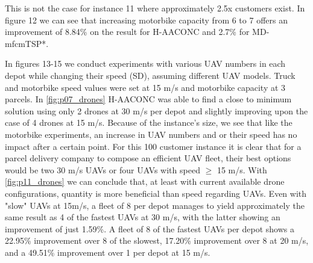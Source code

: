 \documentclass{article}
\begin{document}
	\par 
	This is not the case for instance 11 where approximately 2.5x customers exist. In figure 12 we can see that increasing motorbike capacity from 6 to 7 offers an improvement of 8.84\% on the result for H-AACONC and 2.7\% for MD-mfcmTSP*.
	\par 
	In figures 13-15 we conduct experiments with various UAV numbers in each depot while changing their speed (SD), assuming different UAV models. Truck and motorbike speed values were set at 15 m/s and motorbike capacity at 3 parcels. In \autoref{fig:p07_drones} H-AACONC was able to find a close to minimum solution using only 2 drones at 30 m/s per depot and slightly improving upon the case of 4 drones at 15 m/s. Because of the instance's size, we see that like the motorbike experiments, an increase in UAV numbers and or their speed has no impact after a certain point. For this 100 customer instance it is clear that for a parcel delivery company to compose an efficient UAV fleet, their best options would be two 30 m/s UAVs or four UAVs with speed $\geq$ 15 m/s. With \autoref{fig:p11_drones} we can conclude that, at least with current available drone configurations, quantity is more beneficial than speed regarding UAVs. Even with "slow" UAVs at 15m/s, a fleet of 8 per depot manages to yield approximately the same result as 4 of the fastest UAVs at 30 m/s, with the latter showing an improvement of just 1.59\%. A fleet of 8 of the fastest UAVs per depot shows a 22.95\% improvement over 8 of the slowest, 17.20\% improvement over 8 at 20 m/s, and a 49.51\% improvement over 1 per depot at 15 m/s.
	
\end{document}
